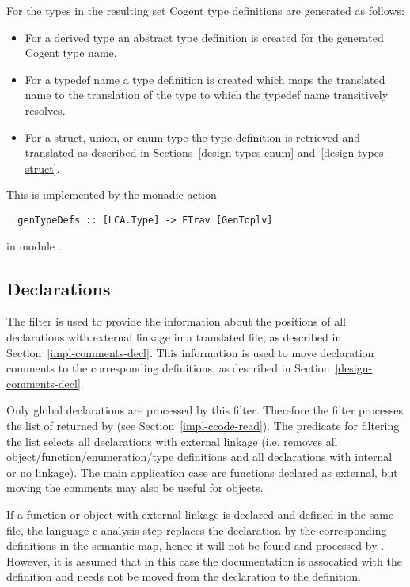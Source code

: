 For the types in the resulting set Cogent type definitions are generated as follows:
\begin{itemize}
\item For a derived type an abstract type definition is created for the generated Cogent type name.
\item For a typedef name a type definition is created which maps the translated name to the translation of the type
to which the typedef name transitively resolves.
\item For a struct, union, or enum type the type definition is retrieved and translated as described in 
Sections~\ref{design-types-enum} and~\ref{design-types-struct}.
\end{itemize}
This is implemented by the monadic action
\begin{verbatim}
  genTypeDefs :: [LCA.Type] -> FTrav [GenToplv]
\end{verbatim}
in module .



\subsection{Declarations}
\label{impl-ccomps-decls}

The filter  is used to provide the information about the positions of all declarations with
external linkage in
a translated file, as described in Section~\ref{impl-comments-decl}. This information is used to move declaration
comments to the corresponding definitions, as described in Section~\ref{design-comments-decl}.

Only global declarations are processed by this filter. Therefore the filter processes the list of 
returned by  (see Section~\ref{impl-ccode-read}). The predicate for filtering the list
selects all declarations with external linkage (i.e. removes all object/function/enumeration/type definitions and 
all declarations with internal or no linkage). 
The main application case are functions declared as external, but moving the comments may also be useful for 
objects.

If a function or object with external linkage is declared and defined in the same file, the language-c analysis step
replaces the declaration by the corresponding definitions in the semantic map, hence it will not be found and processed
by . However, it is assumed that in this case the documentation is assocatied with the definition
and needs not be moved from the declaration to the definition.

